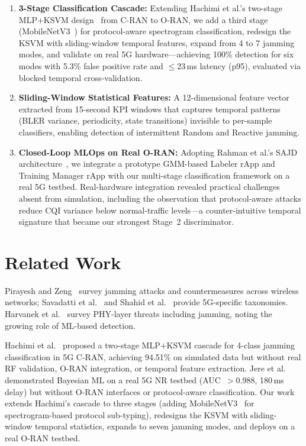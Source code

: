 \documentclass[conference]{IEEEtran}
\begin{document}
\begin{enumerate}
    \item \textbf{3-Stage Classification Cascade:} Extending Hachimi et al.'s two-stage MLP$+$KSVM design~\cite{hachimi2020} from C-RAN to O-RAN, we add a third stage (MobileNetV3~\cite{howard2019}) for protocol-aware spectrogram classification, redesign the KSVM with sliding-window temporal features, expand from 4 to 7 jamming modes, and validate on real 5G hardware---achieving 100\% detection for six modes with 5.3\% false positive rate and $\leq$23\,ms latency (p95), evaluated via blocked temporal cross-validation.

    \item \textbf{Sliding-Window Statistical Features:} A 12-dimensional feature vector extracted from 15-second KPI windows that captures temporal patterns (BLER variance, periodicity, state transitions) invisible to per-sample classifiers, enabling detection of intermittent Random and Reactive jamming.

    \item \textbf{Closed-Loop MLOps on Real O-RAN:} Adopting Rahman et al.'s SAJD architecture~\cite{rahman2025}, we integrate a prototype GMM-based Labeler rApp and Training Manager rApp with our multi-stage classification framework on a real 5G testbed. Real-hardware integration revealed practical challenges absent from simulation, including the observation that protocol-aware attacks reduce CQI variance below normal-traffic levels---a counter-intuitive temporal signature that became our strongest Stage~2 discriminator.
\end{enumerate}


\section{Related Work}
\label{sec:related}

Pirayesh and Zeng~\cite{pirayesh2022} survey jamming attacks and countermeasures across wireless networks; Savadatti et al.~\cite{savadatti2024} and Shahid et al.~\cite{shahid2024} provide 5G-specific taxonomies. Harvanek et al.~\cite{harvanek2024} survey PHY-layer threats including jamming, noting the growing role of ML-based detection.

Hachimi et al.~\cite{hachimi2020} proposed a two-stage MLP$+$KSVM cascade for 4-class jamming classification in 5G C-RAN, achieving 94.51\% on simulated data but without real RF validation, O-RAN integration, or temporal feature extraction. Jere et al.~\cite{jere2024} demonstrated Bayesian ML on a real 5G NR testbed (AUC~$>$0.988, 180\,ms delay) but without O-RAN interfaces or protocol-aware classification. Our work extends Hachimi's cascade to three stages (adding MobileNetV3~\cite{howard2019} for spectrogram-based protocol sub-typing), redesigns the KSVM with sliding-window temporal statistics, expands to seven jamming modes, and deploys on a real O-RAN testbed.
\end{document}
